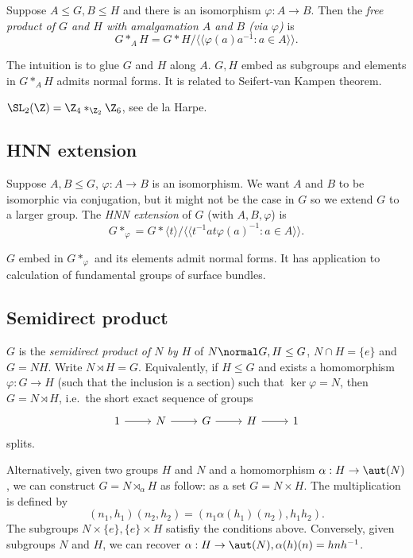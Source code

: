 \documentclass[a4paper]{article}
\begin{document}
Suppose \(A \leq G, B \leq H\) and there is an isomorphism \(\varphi: A \to B\). Then the \emph{free product of \(G\) and \(H\) with amalgamation \(A\) and \(B\) (via \(\varphi\))} is
\[
  G *_A H = G * H/ \langle\langle \varphi(a)a^{-1}: a \in A \rangle\rangle.
\]

The intuition is to glue \(G\) and \(H\) along \(A\). \(G, H\) embed as subgroups and elements in \(G *_A H\) admits normal forms. It is related to Seifert-van Kampen theorem.

\begin{eg}
  \(\SL_2(\Z) = \Z_4 *_{\Z_2} \Z_6\), see de la Harpe.
\end{eg}

\subsection{HNN extension}

Suppose \(A, B \leq G\), \(\varphi: A \to B\) is an isomorphism. We want \(A\) and \(B\) to be isomorphic via conjugation, but it might not be the case in \(G\) so we extend \(G\) to a larger group. The \emph{HNN extension} of \(G\) (with \(A, B, \varphi\)) is
\[
  G *_\varphi = G * \langle t \rangle / \langle\langle t^{-1}at\varphi(a)^{-1}: a \in A \rangle\rangle.
\]

\(G\) embed in \(G *_\varphi\) and its elements admit normal forms. It has application to calculation of fundamental groups of surface bundles.

\subsection{Semidirect product}

\(G\) is the \emph{semidirect product of \(N\) by \(H\)} of \(N \normal G, H \leq G\), \(N \cap H = \{e\}\) and \(G = NH\). Write \(N \rtimes H = G\). Equivalently, if \(H \leq G\) and exists a homomorphism \(\varphi: G \to H\) (such that the inclusion is a section) such that \(\ker \varphi = N\), then \(G = N \rtimes H\), i.e.\ the short exact sequence of groups
\[
  \begin{tikzcd}
    1 \ar[r] & N \ar[r] & G \ar[r] & H \ar[r] & 1
  \end{tikzcd}
\]
splits.

Alternatively, given two groups \(H\) and \(N\) and a homomorphism \(\alpha: H \to \aut(N)\), we can construct \(G = N \rtimes_\alpha H\) as follow: as a set \(G = N \times H\). The multiplication is defined by
\[
  (n_1, h_1) (n_2, h_2) = (n_1 \alpha(h_1)(n_2), h_1h_2).
\]
The subgroups \(N \times \{e\}, \{e\} \times H\) satisfiy the conditions above. Conversely, given subgroups \(N\) and \(H\), we can recover \(\alpha: H \to \aut(N), \alpha(h)(n) = hnh^{-1}\).
\end{document}
